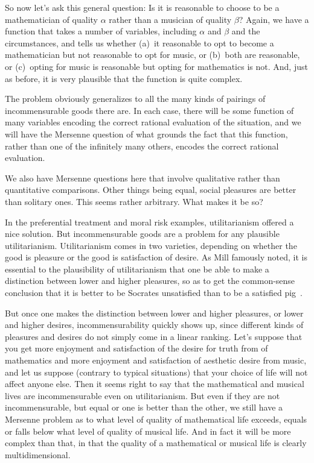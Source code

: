 So now let's ask this general question: Is it is reasonable to choose to be a mathematician of quality $\alpha$ rather than
a musician of quality $\beta$? Again, we have a function that takes a number of variables, including $\alpha$ and $\beta$
and the circumstances, and tells us whether (a)~it reasonable to opt to become a mathematician but not reasonable to opt for
music, or (b)~both are reasonable, or (c)~opting for music is reasonable but opting for mathematics is not. And, just as before,
it is very plausible that the function is quite complex.

The problem obviously generalizes to all the many kinds of pairings of incommensurable goods there are.  In each case, there 
will be some function of many variables encoding the correct rational evaluation of the situation, and we will have the Mersenne
question of what grounds the fact that this function, rather than one of the infinitely many others, encodes the correct
rational evaluation.

We also have Mersenne questions here that involve qualitative rather than quantitative comparisons. Other things being equal,
social pleasures are better than solitary ones. This seems rather arbitrary. What makes it be so?
 
In the preferential treatment and moral risk examples, utilitarianism offered a nice solution. But incommensurable goods are a problem for any plausible utilitarianism. Utilitarianism comes in two varieties, depending on whether
the good is pleasure or the good is satisfaction of desire. As Mill famously noted, it is essential to the plausibility
of utilitarianism that one be able to make a distinction between lower and higher pleasures, so as to get the common-sense
conclusion that it is better to be Socrates unsatisfied than to be a satisfied pig~\parencite[Chapter~2]{MillUtilitarianism}.

But once one makes the distinction between lower and higher pleasures, or lower and higher desires, incommensurability
quickly shows up, since different kinds of pleasures and desires do not simply come in a linear ranking. Let's suppose that you get more 
enjoyment and satisfaction of the desire for truth from of mathematics and more enjoyment and satisfaction of aesthetic desire from music, and let us suppose (contrary to typical situations)
that your choice of life will not affect anyone else. Then it seems right to say that the mathematical and musical lives are
incommensurable even on utilitarianism. But even if they are not incommensurable, but equal or one is better than the other, 
we still have a Mersenne problem as to what level of quality of mathematical life exceeds, equals or falls below what level of 
quality of musical life. And in fact it will be more complex than that, in that the quality of a mathematical or musical life
is clearly multidimensional.

